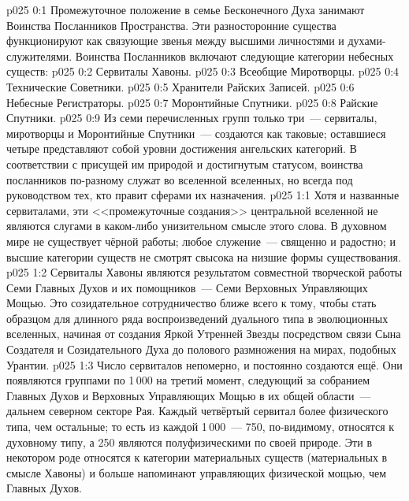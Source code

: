 \author{Высокоуполномоченный}
\vs p025 0:1 Промежуточное положение в семье Бесконечного Духа занимают Воинства Посланников Пространства. Эти разносторонние существа функционируют как связующие звенья между высшими личностями и духами\hyp{}служителями. Воинства Посланников включают следующие категории небесных существ:
\vs p025 0:2 Сервиталы Хавоны.
\vs p025 0:3 Всеобщие Миротворцы.
\vs p025 0:4 Технические Советники.
\vs p025 0:5 Хранители Райских Записей.
\vs p025 0:6 Небесные Регистраторы.
\vs p025 0:7 Моронтийные Спутники.
\vs p025 0:8 Райские Спутники.
\vs p025 0:9 \pc Из семи перечисленных групп только три~--- сервиталы, миротворцы и Моронтийные Спутники~--- создаются как таковые; оставшиеся четыре представляют собой уровни достижения ангельских категорий. В соответствии с присущей им природой и достигнутым статусом, воинства посланников по\hyp{}разному служат во вселенной вселенных, но всегда под руководством тех, кто правит сферами их назначения.
\vs p025 1:1 Хотя и названные сервиталами, эти <<промежуточные создания>> центральной вселенной не являются слугами в каком\hyp{}либо унизительном смысле этого слова. В духовном мире не существует чёрной работы; любое служение~--- священно и радостно; и высшие категории существ не смотрят свысока на низшие формы существования.
\vs p025 1:2 \pc Сервиталы Хавоны являются результатом совместной творческой работы Семи Главных Духов и их помощников~--- Семи Верховных Управляющих Мощью. Это созидательное сотрудничество ближе всего к тому, чтобы стать образцом для длинного ряда воспроизведений дуального типа в эволюционных вселенных, начиная от создания Яркой Утренней Звезды посредством связи Сына Создателя и Созидательного Духа до полового размножения на мирах, подобных Урантии.
\vs p025 1:3 Число сервиталов непомерно, и постоянно создаются ещё. Они появляются группами по 1\,000 на третий момент, следующий за собранием Главных Духов и Верховных Управляющих Мощью в их общей области~--- дальнем северном секторе Рая. Каждый четвёртый сервитал более физического типа, чем остальные; то есть из каждой 1\,000~--- 750, по\hyp{}видимому, относятся к духовному типу, а 250 являются полуфизическими по своей природе. Эти  в некотором роде относятся к категории материальных существ (материальных в смысле Хавоны) и больше напоминают управляющих физической мощью, чем Главных Духов.
